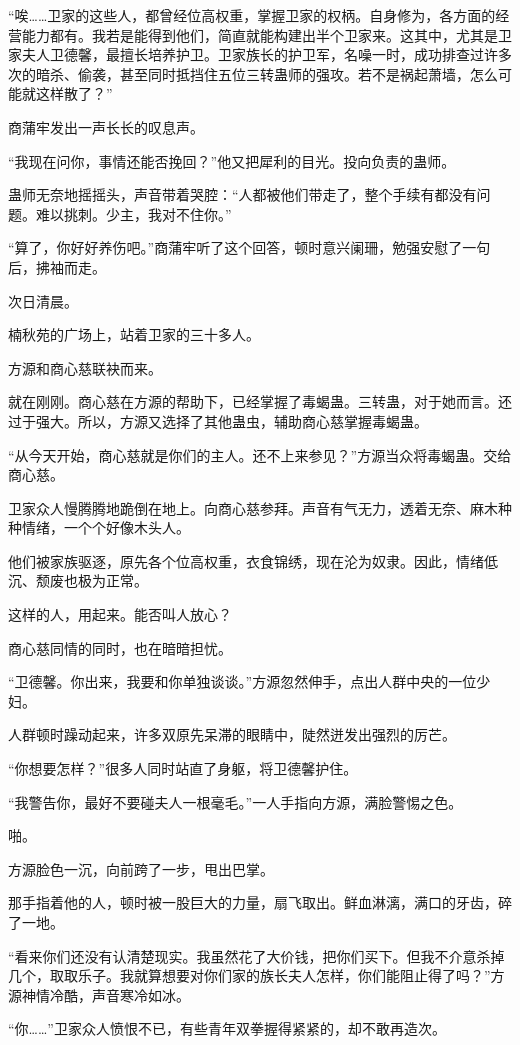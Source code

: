\begin{this_body}
“唉……卫家的这些人，都曾经位高权重，掌握卫家的权柄。自身修为，各方面的经营能力都有。我若是能得到他们，简直就能构建出半个卫家来。这其中，尤其是卫家夫人卫德馨，最擅长培养护卫。卫家族长的护卫军，名噪一时，成功排查过许多次的暗杀、偷袭，甚至同时抵挡住五位三转蛊师的强攻。若不是祸起萧墙，怎么可能就这样散了？”

商蒲牢发出一声长长的叹息声。

“我现在问你，事情还能否挽回？”他又把犀利的目光。投向负责的蛊师。

蛊师无奈地摇摇头，声音带着哭腔：“人都被他们带走了，整个手续有都没有问题。难以挑刺。少主，我对不住你。”

“算了，你好好养伤吧。”商蒲牢听了这个回答，顿时意兴阑珊，勉强安慰了一句后，拂袖而走。

次日清晨。

楠秋苑的广场上，站着卫家的三十多人。

方源和商心慈联袂而来。

就在刚刚。商心慈在方源的帮助下，已经掌握了毒蝎蛊。三转蛊，对于她而言。还过于强大。所以，方源又选择了其他蛊虫，辅助商心慈掌握毒蝎蛊。

“从今天开始，商心慈就是你们的主人。还不上来参见？”方源当众将毒蝎蛊。交给商心慈。

卫家众人慢腾腾地跪倒在地上。向商心慈参拜。声音有气无力，透着无奈、麻木种种情绪，一个个好像木头人。

他们被家族驱逐，原先各个位高权重，衣食锦绣，现在沦为奴隶。因此，情绪低沉、颓废也极为正常。

这样的人，用起来。能否叫人放心？

商心慈同情的同时，也在暗暗担忧。

“卫德馨。你出来，我要和你单独谈谈。”方源忽然伸手，点出人群中央的一位少妇。

人群顿时躁动起来，许多双原先呆滞的眼睛中，陡然迸发出强烈的厉芒。

“你想要怎样？”很多人同时站直了身躯，将卫德馨护住。

“我警告你，最好不要碰夫人一根毫毛。”一人手指向方源，满脸警惕之色。

啪。

方源脸色一沉，向前跨了一步，甩出巴掌。

那手指着他的人，顿时被一股巨大的力量，扇飞取出。鲜血淋漓，满口的牙齿，碎了一地。

“看来你们还没有认清楚现实。我虽然花了大价钱，把你们买下。但我不介意杀掉几个，取取乐子。我就算想要对你们家的族长夫人怎样，你们能阻止得了吗？”方源神情冷酷，声音寒冷如冰。

“你……”卫家众人愤恨不已，有些青年双拳握得紧紧的，却不敢再造次。


\end{this_body}
